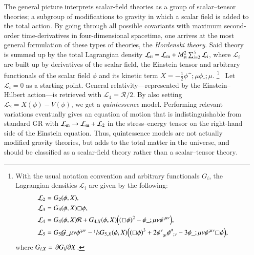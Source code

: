 









The general picture interprets scalar-field theories as a group of scalar--tensor theories; a subgroup of modifications to gravity in which a scalar field is added to the total action. By going through all possible covariants with maximum second-order time-derivatives in four-dimensional spacetime, one arrives at the most general formulation of these types of theories, the \emph{Hordenski theory}. Said theory is summed up by the total Lagrangian density $\mathcal{L}_{\text{\tiny{H}}} = \mathcal{L}_\mathrm{m} + M_{\text{\tiny{Pl}}}^2 \sum_{i=2}^{5} \mathcal{L}_i$, where $\mathcal{L}_i$ are built up by derivatives of the scalar field, the Einstein tensor and arbitrary functionals of the scalar field $\phi$ and its kinetic term $X = - \frac{1}{2} \phi\^{;\mu}\phi\_{;\mu}$.%
\footnote{%
With the usual notation convention and arbitrary functionals $G_i$, the Lagrangian densities $\mathcal{L}_i$ are given by the following:
\begin{equation*}
    \begin{split}
        \mathcal{L}_2 &= G_2(\phi, X), \\
        \mathcal{L}_3 &= G_3 (\phi, X)\sq \phi, \\
        \mathcal{L}_4 &= G_4 (\phi, X)\mathcal{R} + G_{4,X}(\phi, X) \pclosed{ {(\sq \phi)}^2 - \phi\_{;\mu\nu} \phi\^{;\mu\nu}}, \\
        \mathcal{L}_5 &= G_5 \mathcal{G}\_{\mu\nu}\phi\^{;\mu\nu} - \sfrac{1}{6} G_{5,X}(\phi, X)  \pclosed{ {(\sq \phi)}^3 + 
        2\phi\indices{^\nu_{;\mu}}\phi\indices{^\mu_{;\nu}} - 3  \phi\_{;\mu\nu} \phi\^{;\mu\nu} \sq \phi},
    \end{split}
\end{equation*}%
where $G_{i,X}= \pdv*{G_i}{X}$.
}~%
Let $\mathcal{L}_i=0$ as a starting point. %
General relativity---represented by the Einstein--Hilbert action---is retrieved with $\mathcal{L}_4 = \mathcal{R}/2$.  By also setting $\mathcal{L}_2 = X(\phi)-V(\phi)$, we get a \emph{quintessence} model. Performing relevant variations eventually gives an equation of motion that is indistinguishable from standard GR with $\mathcal{L}_\mathrm{m} \to \mathcal{L}_\mathrm{m} + \mathcal{L}_2$ in the stress--energy tensor on the right-hand side of the Einstein equation. Thus, quintessence models are not actually modified gravity theories, but adds to the total matter in the universe, and should be classified as a scalar-field theory rather than a scalar--tensor theory. %





